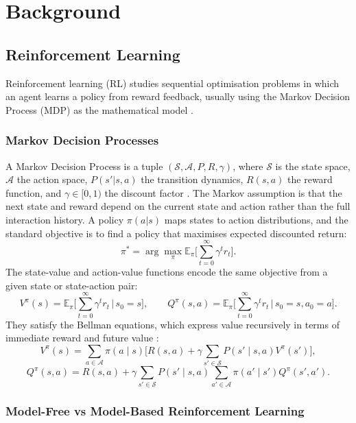 \chapter{Background}
\section{Reinforcement Learning}

Reinforcement learning (RL) studies sequential optimisation problems in
which an agent learns a policy from reward feedback, usually using the
Markov Decision Process (MDP) as the mathematical model
\cite{sutton2018reinforcement,kaelbling1996reinforcementlearningsurvey}.

\subsection{Markov Decision Processes}

A Markov Decision Process is a tuple
$(\mathcal{S},\mathcal{A},P,R,\gamma)$, where $\mathcal{S}$ is the state
space, $\mathcal{A}$ the action space, $P(s'|s,a)$ the transition
dynamics, $R(s,a)$ the reward function, and $\gamma\in[0,1)$ the
discount factor \cite{puterman2014markov,sutton2018reinforcement}. The
Markov assumption is that the next state and reward depend on the
current state and action rather than the full interaction history. A
policy $\pi(a|s)$ maps states to action distributions, and the standard
objective is to find a policy that maximises expected discounted return:
\[
\pi^\ast = \arg\max_\pi \mathbb{E}_{\pi}\Bigg[ \sum_{t=0}^\infty \gamma^t r_t \Bigg].
\]
The state-value and action-value functions encode the same objective
from a given state or state-action pair:
\[
V^\pi(s) = \mathbb{E}_\pi \Bigg[ \sum_{t=0}^\infty \gamma^t r_t \,\Big|\, s_0 = s \Bigg], \qquad
Q^\pi(s,a) = \mathbb{E}_\pi \Bigg[ \sum_{t=0}^\infty \gamma^t r_t \,\Big|\, s_0 = s, a_0 = a \Bigg].
\]
They satisfy the Bellman equations, which express value recursively in
terms of immediate reward and future value
\cite{bellman1957dynamic,sutton2018reinforcement}:
\[
V^\pi(s) = \sum_{a \in \mathcal{A}} \pi(a \mid s) \Big[ R(s,a) + \gamma \sum_{s' \in \mathcal{S}} P(s' \mid s, a) V^\pi(s') \Big],
\]
\[
Q^\pi(s,a) = R(s,a) + \gamma \sum_{s' \in \mathcal{S}} P(s' \mid s, a) \sum_{a' \in \mathcal{A}} \pi(a' \mid s') Q^\pi(s',a').
\]

\subsection{Model-Free vs Model-Based Reinforcement Learning}

